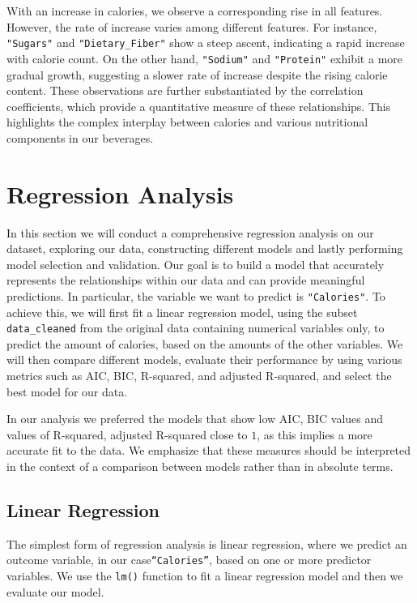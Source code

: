\documentclass[
]{article}
\begin{document}
With an increase in calories, we observe a corresponding rise in all
features. However, the rate of increase varies among different features.
For instance, \texttt{"Sugars"} and \texttt{"Dietary\_Fiber"} show a
steep ascent, indicating a rapid increase with calorie count. On the
other hand, \texttt{"Sodium"} and \texttt{"Protein"} exhibit a more
gradual growth, suggesting a slower rate of increase despite the rising
calorie content. These observations are further substantiated by the
correlation coefficients, which provide a quantitative measure of these
relationships. This highlights the complex interplay between calories
and various nutritional components in our beverages.

\section{Regression Analysis}\label{regression-analysis}

In this section we will conduct a comprehensive regression analysis on
our dataset, exploring our data, constructing different models and
lastly performing model selection and validation. Our goal is to build a
model that accurately represents the relationships within our data and
can provide meaningful predictions. In particular, the variable we want
to predict is \texttt{"Calories"}. To achieve this, we will first fit a
linear regression model, using the subset \texttt{data\_cleaned} from
the original data containing numerical variables only, to predict the
amount of calories, based on the amounts of the other variables. We will
then compare different models, evaluate their performance by using
various metrics such as AIC, BIC, R-squared, and adjusted R-squared, and
select the best model for our data.

In our analysis we preferred the models that show low AIC, BIC values
and values of R-squared, adjusted R-squared close to \(1\), as this
implies a more accurate fit to the data. We emphasize that these
measures should be interpreted in the context of a comparison between
models rather than in absolute terms.

\subsection{Linear Regression}\label{linear-regression}

The simplest form of regression analysis is linear regression, where we
predict an outcome variable, in our case\texttt{“Calories”}, based on
one or more predictor variables. We use the \texttt{lm()} function to
fit a linear regression model and then we evaluate our model.
\end{document}

